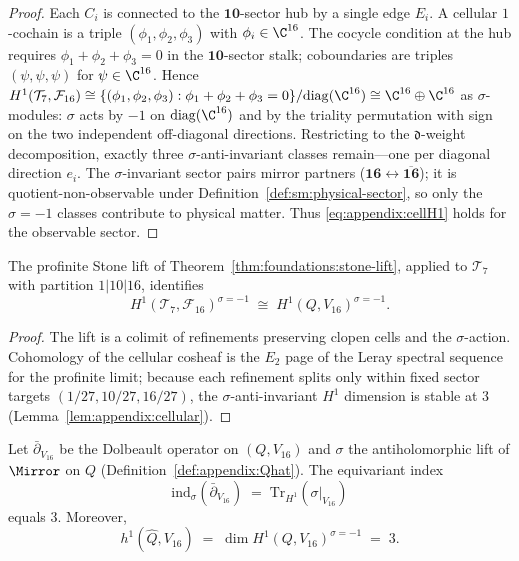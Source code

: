 \begin{proof}
Each $C_i$ is connected to the $\mathbf{10}$-sector hub by a single edge
$E_i$. A cellular $1$-cochain is a triple $(\phi_1,\phi_2,\phi_3)$ with
$\phi_i\in\C^{16}$. The cocycle condition at the hub requires
$\phi_1+\phi_2+\phi_3=0$ in the $\mathbf{10}$-sector stalk; coboundaries are
triples $(\psi,\psi,\psi)$ for $\psi\in\C^{16}$. Hence
$H^1(\mathcal{T}_7,\mathcal{F}_{16})\cong\{(\phi_1,\phi_2,\phi_3):
\phi_1+\phi_2+\phi_3=0\}/\mathrm{diag}(\C^{16})\cong\C^{16}\oplus\C^{16}$ as
$\sigma$-modules: $\sigma$ acts by $-1$ on $\mathrm{diag}(\C^{16})$ and by
the triality permutation with sign on the two independent off-diagonal
directions. Restricting to the $\mathfrak{d}$-weight decomposition, exactly
three $\sigma$-anti-invariant classes remain---one per diagonal direction
$e_i$. The $\sigma$-invariant sector pairs mirror partners
($\mathbf{16}\leftrightarrow\overline{\mathbf{16}}$); it is
quotient-non-observable under Definition~\ref{def:sm:physical-sector}, so only
the $\sigma=-1$ classes contribute to physical matter. Thus
\eqref{eq:appendix:cellH1} holds for the observable sector.
\end{proof}

\begin{proposition}\label{prop:appendix:stone-lift}
The profinite Stone lift of Theorem~\ref{thm:foundations:stone-lift}, applied
to $\mathcal{T}_7$ with partition $1|10|16$, identifies
\begin{equation}\label{eq:appendix:lift}
  H^1(\mathcal{T}_7,\mathcal{F}_{16})^{\sigma=-1}
  \;\cong\;
  H^1(Q,V_{16})^{\sigma=-1}.
\end{equation}
\end{proposition}

\begin{proof}
The lift is a colimit of refinements preserving clopen cells and the
$\sigma$-action. Cohomology of the cellular cosheaf is the $E_2$ page of the
Leray spectral sequence for the profinite limit; because each refinement
splits only within fixed sector targets $(1/27,10/27,16/27)$, the
$\sigma$-anti-invariant $H^1$ dimension is stable at $3$
(Lemma~\ref{lem:appendix:cellular}).
\end{proof}

\begin{theorem}\label{thm:appendix:mirror-index}
Let $\bar\partial_{V_{16}}$ be the Dolbeault operator on $(Q,V_{16})$ and
$\sigma$ the antiholomorphic lift of $\Mirror$ on $Q$
(Definition~\ref{def:appendix:Qhat}). The equivariant index
\begin{equation}\label{eq:appendix:index}
  \mathrm{ind}_\sigma(\bar\partial_{V_{16}})
  \;=\;
  \mathrm{Tr}_{H^1}(\sigma|_{V_{16}})
\end{equation}
equals $3$. Moreover,
\begin{equation}\label{eq:appendix:h1}
  h^1(\hat Q,V_{16})
  \;=\;
  \dim H^1(Q,V_{16})^{\sigma=-1}
  \;=\; 3.
\end{equation}
\end{theorem}

